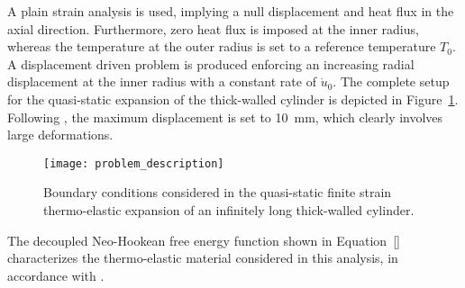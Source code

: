 A plain strain analysis is used, implying a null displacement and heat flux in the axial direction.
Furthermore, zero heat flux is imposed at the inner radius, whereas the temperature at the outer radius is set to a reference temperature \(T_{0}\).
A displacement driven problem is produced enforcing an increasing radial displacement at the inner radius with a constant rate of \(\dot{u}_{0}\).
The complete setup for the quasi-static expansion of the thick-walled cylinder is depicted in Figure~\ref{fig:problem_description}.
Following \cite{ibrahimbegovic_thermodynamics_2009}, the maximum displacement is set to \SI{10}{\milli\meter}, which clearly involves large deformations.

\begin{figure}
  \centering
  \texttt{[image: problem\_description]}
  \caption{Boundary conditions considered in the quasi-static finite strain thermo-elastic expansion of an infinitely long thick-walled cylinder.}
\label{fig:problem_description}
\end{figure}

The decoupled Neo-Hookean free energy function shown in Equation~\ref{} characterizes the thermo-elastic material considered in this analysis, in accordance with \cite{armero_new_1992}.




